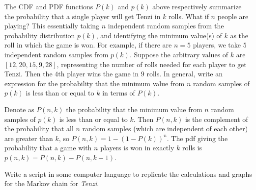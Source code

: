 \documentclass[12pt]{article}
\begin{document}
\renewcommand{\theexerciseseries}{}
\renewcommand{\theexercise}{\arabic{exercise}}

\begin{exercise}
    The CDF and PDF functions \( P(k) \) and \( p(k) \) above
    respectively summarize the probability that a single player will get
    Tenzi in \( k \) rolls.  What if \( n \) people are playing?  This
    essentially taking \( n \) independent random samples from the
    probability distribution \( p(k) \), and identifying the minimum
    value(s) of \( k \) as the roll in which the game is won.  For
    example, if there are \( n=5 \) players, we take \( 5 \) independent
    random samples from \( p(k) \).  Suppose the arbitrary values of \(
    k \) are \( [12,20,15,9,28] \), representing the number of rolls
    needed for each player to get Tenzi.  Then the \( 4 \)th player wins
    the game in \( 9 \) rolls.  In general, write an expression for the
    probability that the minimum value from \( n \) random samples of \(
    p(k) \) is less than or equal to \( k \) in terms of \( P(k) \).
\end{exercise}
\begin{solution}
    Denote as \( P(n,k) \) the probability that the minimum value from \(
    n \) random samples of \( p(k) \) is less than or equal to \( k \).
    Then \( P(n,k) \) is the complement of the probability that all \( n
    \) random samples (which are independent of each other) are greater
    than \( k \), so \( P(n,k)=1 - (1 - P(k))^n \).  The pdf giving the
    probability that a game with \( n \) players is won in exactly \( k \)
    rolls is \( p(n, k)=P(n,k) - P(n,k - 1) \).
\end{solution}
\begin{exercise}
    Write a script in some computer language to replicate the
    calculations and graphs for the Markov chain for \emph{Tenzi}.
\end{exercise}
\end{document}
